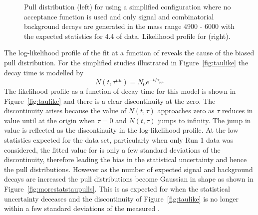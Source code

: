 {\begin{figure}[htbp]
    \caption{Pull distribution (left) for \tmumu using a simplified configuration where no acceptance function is used and only signal and combinatorial background decays are generated in the mass range 4900 - 6000 \mevcc with the expected statistics for 4.4 \fb of data. Likelihood profile for \tmumu(right).}%
    \label{fig:taupulls}
\end{figure}

The log-likelihood profile of the  fit at a function of \tmumu reveals the cause of the biased pull distribution. For the simplified studies illustrated in Figure~\ref{fig:taulike} the decay time is modelled by
\begin{equation}
N(t, \tau^{\mu \mu}) = N_{0}e^{-t/\tau_{\mu\mu}}
\end{equation}
The likelihood profile as a function of decay time for this model is shown in Figure~\ref{fig:taulike} and there is a clear discontinuity at the zero. The discontinuity arises because the value of $N(t, \tau)$ approaches zero as $\tau$ reduces in value until at the origin when $\tau = 0$ and $N(t, \tau)$ jumps to infinity. The jump in value is reflected as the discontinuity in the log-likelihood profile. At the low statistics expected for the data set, particularly when only Run 1 data was considered, the fitted value for \tmumu is only a few standard deviations of the discontinuity, therefore leading the bias in the statistical uncertainty and hence the pull distributions. However as the number of expected signal and background decays are increased the \tmumu pull distributions become Gaussian in shape as shown in Figure~\ref{fig:morestatstaupulls}. This is as expected for when the statistical uncertainty deceases and the discontinuity of Figure~\ref{fig:taulike} is no longer within a few standard deviations of the measured \tmumu.



}

